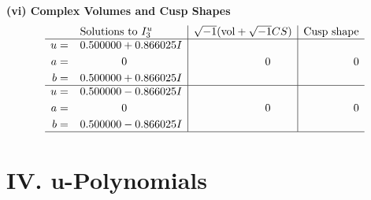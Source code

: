 \documentclass[1p]{elsarticle_modified}
\theoremstyle{definition}
\newcommand{\I}{\sqrt{-1}}
\begin{document}
\newpage\flushleft \textbf{(vi) Complex Volumes and Cusp Shapes}
$$\begin{array}{c|c|c}  
\text{Solutions to }I^u_{3}& \I (\text{vol} + \sqrt{-1}CS) & \text{Cusp shape}\\
 \hline 
\begin{aligned}
u &= \phantom{-}0.500000 + 0.866025 I \\
a &= \phantom{-0.000000 } 0 \\
b &= \phantom{-}0.500000 + 0.866025 I\end{aligned}
 & \phantom{-0.000000 } 0 & \phantom{-0.000000 } 0 \\ \hline\begin{aligned}
u &= \phantom{-}0.500000 - 0.866025 I \\
a &= \phantom{-0.000000 } 0 \\
b &= \phantom{-}0.500000 - 0.866025 I\end{aligned}
 & \phantom{-0.000000 } 0 & \phantom{-0.000000 } 0\\
 \hline 
 \end{array}$$\newpage
\newpage\renewcommand{\arraystretch}{1}
\centering \section*{ IV. u-Polynomials}
\end{document}
